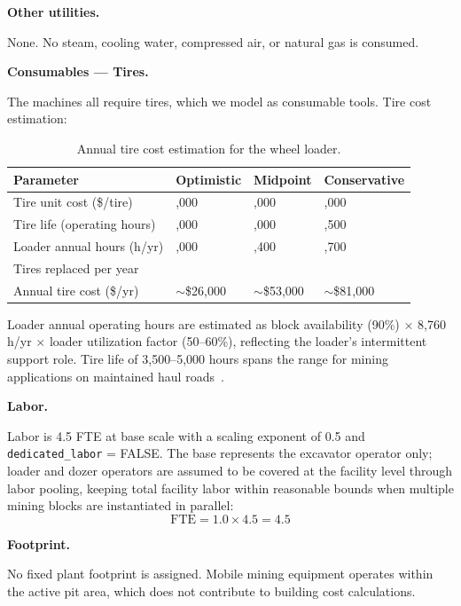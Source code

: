 \medskip
\noindent\textbf{Other utilities.}\quad

None. No steam, cooling water, compressed air, or natural gas is consumed.

\medskip
\noindent\textbf{Consumables --- Tires.}\quad

The machines all require tires, which we model as consumable tools. Tire cost estimation:

\begin{table}[h!]
\caption{Annual tire cost estimation for the wheel loader.}
\centering
\begin{tabular}{>{\raggedright\arraybackslash}p{4.7cm}
				>{\raggedright\arraybackslash}p{2.9cm}
				>{\raggedright\arraybackslash}p{2.7cm}
				>{\raggedright\arraybackslash}p{2.9cm}}
\toprule
\textbf{Parameter} & \textbf{Optimistic} & \textbf{Midpoint} & \textbf{Conservative} \\
\midrule
Tire unit cost (\$/tire) & 8,000 & 12,000 & 15,000 \\
Tire life (operating hours) & 5,000 & 4,000 & 3,500 \\
Loader annual hours (h/yr) & 4,000 & 4,400 & 4,700 \\
Tires replaced per year & 3.2 & 4.4 & 5.4 \\
Annual tire cost (\$/yr) & $\sim$\$26,000 & $\sim$\$53,000 & $\sim$\$81,000 \\
\bottomrule
\end{tabular}
\end{table}

\noindent Loader annual operating hours are estimated as block availability (90\%) $\times$ 8,760 h/yr $\times$ loader utilization factor (50--60\%), reflecting the loader's intermittent support role. Tire life of 3,500--5,000 hours spans the range for mining applications on maintained haul roads~\citep{CatPerformanceHandbookfromVSTfuelconsumption20221209T212009}.

\medskip
\noindent\textbf{Labor.}\quad

Labor is 4.5 FTE at base scale with a scaling exponent of 0.5 and \texttt{dedicated\_labor} = FALSE. The base represents the excavator operator only; loader and dozer operators are assumed to be covered at the facility level through labor pooling, keeping total facility labor within reasonable bounds when multiple mining blocks are instantiated in parallel:
\[
	\text{FTE} = 1.0 \times 4.5 = 4.5
\]

\medskip
\noindent\textbf{Footprint.}\quad

No fixed plant footprint is assigned. Mobile mining equipment operates within the active pit area, which does not contribute to building cost calculations.
 
